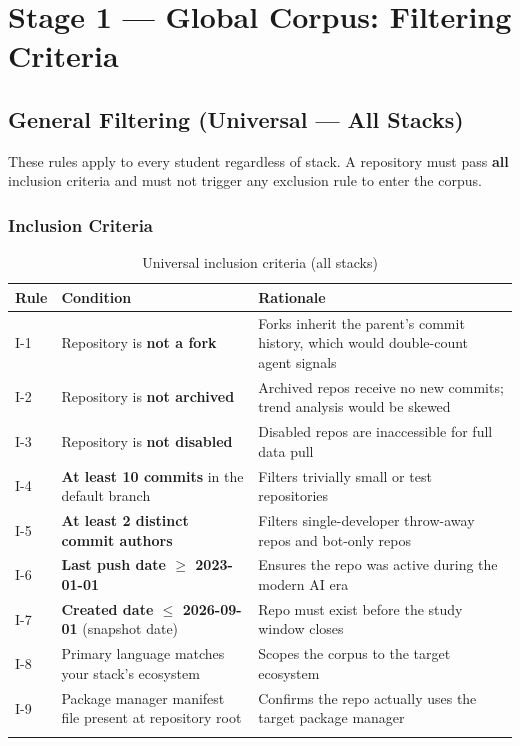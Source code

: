 \documentclass[11pt,a4paper]{article}
\begin{document}
\section{Stage 1 — Global Corpus: Filtering Criteria}

\subsection{General Filtering (Universal — All Stacks)}

These rules apply to every student regardless of stack. A repository must pass \textbf{all} inclusion criteria and must not trigger any exclusion rule to enter the corpus.

\subsubsection{Inclusion Criteria}

\begin{longtable}{lp{8cm}p{4.5cm}}
\toprule
\textbf{Rule} & \textbf{Condition} & \textbf{Rationale} \\
\midrule
\endhead
I-1 & Repository is \textbf{not a fork} & Forks inherit the parent's commit history, which would double-count agent signals \\
I-2 & Repository is \textbf{not archived} & Archived repos receive no new commits; trend analysis would be skewed \\
I-3 & Repository is \textbf{not disabled} & Disabled repos are inaccessible for full data pull \\
I-4 & \textbf{At least 10 commits} in the default branch & Filters trivially small or test repositories \\
I-5 & \textbf{At least 2 distinct commit authors} & Filters single-developer throw-away repos and bot-only repos \\
I-6 & \textbf{Last push date $\geq$ 2023-01-01} & Ensures the repo was active during the modern AI era \\
I-7 & \textbf{Created date $\leq$ 2026-09-01} (snapshot date) & Repo must exist before the study window closes \\
I-8 & Primary language matches your stack's ecosystem & Scopes the corpus to the target ecosystem \\
I-9 & Package manager manifest file present at repository root & Confirms the repo actually uses the target package manager \\
\bottomrule
\caption{Universal inclusion criteria (all stacks)}
\end{longtable}
\end{document}
